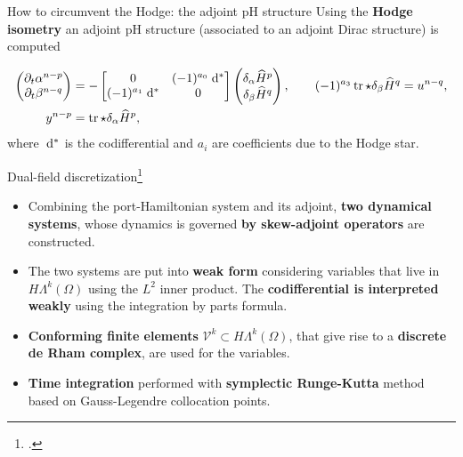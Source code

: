\documentclass[aspectratio=169]{beamer}
\DeclareMathOperator{\tr}{tr}
\newcommand*{\dual}[1]{\ensuremath{\widehat{#1}}}
\begin{document}
\begin{frame}{How to circumvent the Hodge: the adjoint pH structure}
	Using the \textbf{Hodge isometry} an adjoint pH structure (associated to an adjoint Dirac structure) is computed
	
	\begin{tcolorbox}[nobeforeafter, colframe=theme,title=Adjoint pH system]%
	\begin{equation*}
		\begin{aligned}
			\begin{pmatrix}
				\partial_t {\alpha}^{n-p} \\
				\partial_t {\beta}^{n-q} \\
			\end{pmatrix} &= -
			\begin{bmatrix}
				0 &  (-1)^{a_0}\d{}^* \\
				(-1)^{a_1}\d{}^* & 0 \\
			\end{bmatrix}
			\begin{pmatrix}
				\delta_{\alpha} \dual{H}^p \\
				\delta_{{\beta}} \dual{H}^q
			\end{pmatrix}, \qquad (-1)^{a_3}\tr \star \delta_{{\beta}} \dual{H}^q= u^{n-q}, \\
			y^{n-p} &= \tr \star \delta_{\alpha} \dual{H}^p,
		\end{aligned}
	\end{equation*}
	where $\d{}^{*}$ is the codifferential and $a_i$ are coefficients due to the Hodge star.
	\end{tcolorbox} 

\end{frame}
	
\begin{frame}{Dual-field discretization\footcite{brugnoli2022df}}
	\begin{itemize}
		\item Combining the port-Hamiltonian system and its adjoint, \textbf{two dynamical systems}, whose dynamics is governed \textbf{by skew-adjoint operators} are constructed.
		\item The two systems are put into \textbf{weak form} considering variables that live in $H\Lambda^k(\Omega)$ using the $L^2$ inner product. The \textbf{codifferential is interpreted weakly} using the integration by parts formula.
		\item \textbf{Conforming finite elements} $\mathcal{V}^k \subset H\Lambda^k(\Omega)$, that give rise to a \textbf{discrete de Rham complex}, are used for the variables.
		\item \textbf{Time integration} performed with \textbf{symplectic Runge-Kutta} method based on Gauss-Legendre collocation points.
	\end{itemize}
	
\end{frame}
\end{document}
